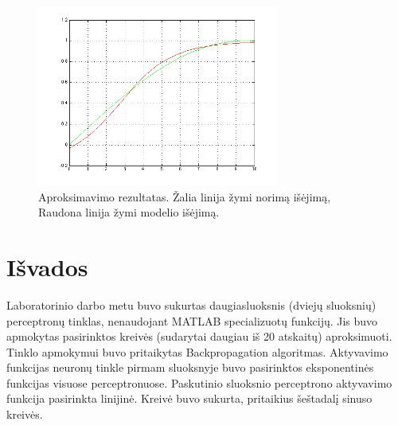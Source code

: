 \documentclass[11pt, a4paper, lithuanian]{article}
\begin{document}
    \begin{figure}[h]
      \centering
      \includegraphics[width=300px]{img/rezultatas.png}
      \caption{Aproksimavimo rezultatas. Žalia linija žymi norimą išėjimą, Raudona linija žymi modelio išėjimą.}
      \label{fig:aproksimavimo_rezultatas}
    \end{figure}

    \section{Išvados}

    Laboratorinio darbo metu buvo sukurtas daugiasluoksnis (dviejų sluoksnių) perceptronų tinklas, nenaudojant MATLAB specializuotų funkcijų. Jis buvo apmokytas pasirinktos kreivės (sudarytai daugiau iš 20 atskaitų) aproksimuoti. Tinklo apmokymui buvo pritaikytas Backpropagation algoritmas. Aktyvavimo funkcijas neuronų tinkle pirmam sluoksnyje buvo pasirinktos eksponentinės funkcijas visuose perceptronuose. Paskutinio sluoksnio perceptrono aktyvavimo funkcija pasirinkta linijinė. Kreivė buvo sukurta, pritaikius šeštadalį sinuso kreivės.
\end{document}
